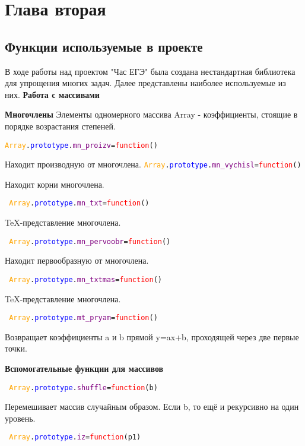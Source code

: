 \section{Глава вторая}
\subsection{Функции используемые в проекте}
В ходе работы над проектом "Час ЕГЭ" была создана нестандартная библиотека для упрощения многих задач. Далее представлены наиболее используемые из них.
\textbf{Работа с массивами}

\textbf{Многочлены}
Элементы одномерного массива Array - коэффициенты, стоящие в порядке возрастания степеней.

\texttt{\textcolor{Orange}{Array}.\textcolor{Blue}{prototype}.\textcolor{Purple}{mn\_proizv}=\textcolor{Red}{function}()}

Находит производную от многочлена.
\texttt{\textcolor{Orange}{Array}.\textcolor{Blue}{prototype}.\textcolor{Purple}{mn\_vychisl}=\textcolor{Red}{function}()}

Находит корни многочлена.

\texttt{
\textcolor{Orange}{Array}.\textcolor{Blue}{prototype}.\textcolor{Purple}{mn\_txt}=\textcolor{Red}{function}()}

TeX-представление многочлена.%

\texttt{
	\textcolor{Orange}{Array}.\textcolor{Blue}{prototype}.\textcolor{Purple}{mn\_pervoobr}=\textcolor{Red}{function}()
}

Находит первообразную от многочлена.%

\texttt{
	\textcolor{Orange}{Array}.\textcolor{Blue}{prototype}.\textcolor{Purple}{mn\_txtmas}=\textcolor{Red}{function}()
}

TeX-представление многочлена.

\texttt{
	\textcolor{Orange}{Array}.\textcolor{Blue}{prototype}.\textcolor{Purple}{mt\_pryam}=\textcolor{Red}{function}()
}

Возвращает коэффициенты a и b прямой y=ax+b, проходящей через две первые точки.

\textbf{Вспомогательные функции для массивов}

\texttt{
	\textcolor{Orange}{Array}.\textcolor{Blue}{prototype}.\textcolor{Purple}{shuffle}=\textcolor{Red}{function}(b)
}

Перемешивает массив случайным образом. Если b, то ещё и рекурсивно на один уровень.

\texttt{
	\textcolor{Orange}{Array}.\textcolor{Blue}{prototype}.\textcolor{Purple}{iz}=\textcolor{Red}{function}(p1)
}

